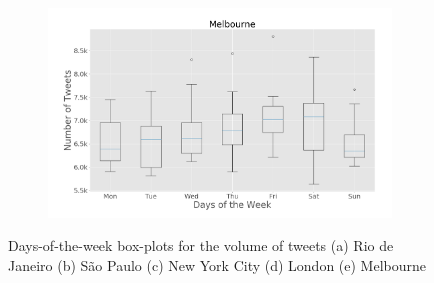 \begin{figure}[htbp]
     \begin{subfigure}[htbp]{0.45\textwidth}
        \centering
        \includegraphics[width=1\linewidth]{figures/melbourne_box_plt_day_of_week.png}
        \caption{}
        \label{subfig:melbourne_box_plot_day_of_week}
    \end{subfigure}
    
\caption[Days-of-the-week box-plots for the volume of tweets]{Days-of-the-week box-plots for the volume of tweets (a) Rio de Janeiro (b) São Paulo (c) New York City (d) London (e) Melbourne}
\label{fig:box_plots_day_of_week}
\end{figure}

